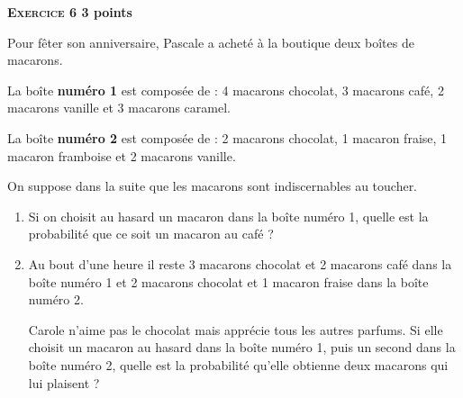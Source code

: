\textbf{\textsc{Exercice 6} \hfill 3 points}

\medskip

Pour fêter son anniversaire, Pascale a acheté à la boutique deux boîtes de macarons.

La boîte \textbf{numéro 1} est composée de : 4 macarons chocolat, 3 macarons café, 2 macarons vanille
et 3 macarons caramel.

La boîte \textbf{numéro 2} est composée de : 2 macarons chocolat, 1 macaron fraise, 1 macaron
framboise et 2 macarons vanille.

On suppose dans la suite que les macarons sont indiscernables au toucher.

\medskip

\begin{enumerate}
\item Si on choisit au hasard un macaron dans la boîte numéro 1, quelle est la probabilité que ce soit
un macaron au café ?
\item Au bout d'une heure il reste 3 macarons chocolat et 2 macarons café dans la boîte numéro 1
et 2 macarons chocolat et 1 macaron fraise dans la boîte numéro 2.

Carole n'aime pas le chocolat mais apprécie tous les autres parfums. Si elle choisit un macaron
au hasard dans la boîte numéro 1, puis un second dans la boîte numéro 2, quelle est la probabilité
qu'elle obtienne deux macarons qui lui plaisent ?
\end{enumerate}

\bigskip

